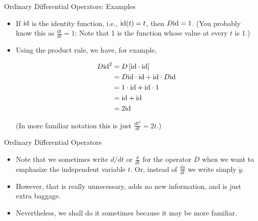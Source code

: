 \begin{frame}
Ordinary Differential Operators: Examples
 
\begin{itemize}
  
\item If $\text{id}$ is the identity function, i.e., $\text{id}(t)=t$, then
 $D\text{id}=1$. (You probably know this 
as $\frac{dt}{dt}=1$; Note that 1 is the function whose value at every $t$ is 1.)
  
\item Using the product rule, we have, for example,

\begin{align*}
D\text{id}^2 &= D\left[\text{id} \cdot \text{id} \right]\\
&= D\text{id} \cdot \text{id} + \text{id} \cdot D\text{id}\\
&= 1 \cdot \text{id} + \text{id} \cdot 1\\
&= \text{id} + \text{id}\\
&= 2\text{id}
\end{align*}

(In more familiar notation this is just $\frac{dt^2}{dt}=2t$.)
 
\end{itemize}

\end{frame}



\begin{frame}
Ordinary Differential Operators
 
\begin{itemize}

 \item Note that we sometimes write $d/dt$ or $\frac{d}{dt}$ for
 the operator $D$ when we want to emphasize 
the independent
 variable $t$.  Or, instead of $\frac{dy}{dt}$ we write simply $\dot{y}$.
 
\item However, that is really unnecessary, adds no new information, and is just extra
 baggage.
 
\item Nevertheless, we shall do it sometimes because it may be more familiar.

\end{itemize}

\end{frame}



